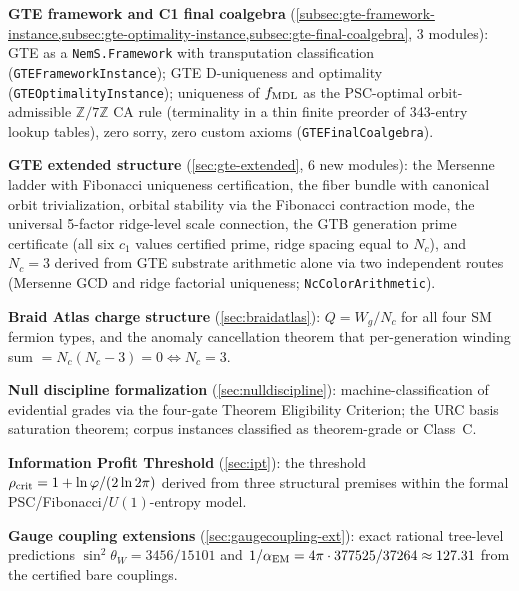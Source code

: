 \documentclass[11pt,a4paper]{article}
\theoremstyle{definition}
\begin{document}
\medskip
\noindent\textbf{GTE framework and C1 final coalgebra}
(\cref{subsec:gte-framework-instance,subsec:gte-optimality-instance,subsec:gte-final-coalgebra}, 3 modules):
GTE as a \texttt{NemS.Framework} with transputation classification (\texttt{GTEFrameworkInstance});
GTE D-uniqueness and optimality (\texttt{GTEOptimalityInstance});
uniqueness of $f_{\rm MDL}$ as the PSC-optimal orbit-admissible $\mathbb{Z}/7\mathbb{Z}$ CA rule (terminality in a thin finite preorder of 343-entry lookup tables), zero sorry, zero custom axioms (\texttt{GTEFinalCoalgebra}).

\medskip
\noindent\textbf{GTE extended structure}
(\cref{sec:gte-extended}, 6 new modules):
the Mersenne ladder with Fibonacci uniqueness certification, the fiber bundle
with canonical orbit trivialization, orbital stability via the Fibonacci
contraction mode, the universal 5-factor ridge-level scale connection,
the GTB generation prime certificate (all six $c_1$ values certified prime,
ridge spacing equal to $N_c$),
and $N_c = 3$ derived from GTE substrate arithmetic alone via two independent
routes (Mersenne GCD and ridge factorial uniqueness; \texttt{NcColorArithmetic}).

\medskip
\noindent\textbf{Braid Atlas charge structure}
(\cref{sec:braidatlas}):
$Q = W_g/N_c$ for all four SM fermion types, and the anomaly cancellation
theorem that per-generation winding sum $= N_c(N_c-3) = 0 \Leftrightarrow N_c = 3$.

\medskip
\noindent\textbf{Null discipline formalization}
(\cref{sec:nulldiscipline}):
machine-classification of evidential grades via the four-gate Theorem Eligibility
Criterion; the URC basis saturation theorem; corpus instances classified as
theorem-grade or Class~C.

\medskip
\noindent\textbf{Information Profit Threshold}
(\cref{sec:ipt}):
the threshold $\rho_{\rm crit} = 1 + \ln\varphi/(2\ln 2\pi)$ derived from
three structural premises within the formal PSC/Fibonacci/$U(1)$-entropy model.

\medskip
\noindent\textbf{Gauge coupling extensions}
(\cref{sec:gaugecoupling-ext}):
exact rational tree-level predictions $\sin^2\!\theta_W = 3456/15101$
and $1/\alpha_{\rm EM} = 4\pi \cdot 377525/37264 \approx 127.31$ from the certified bare couplings.
\end{document}
